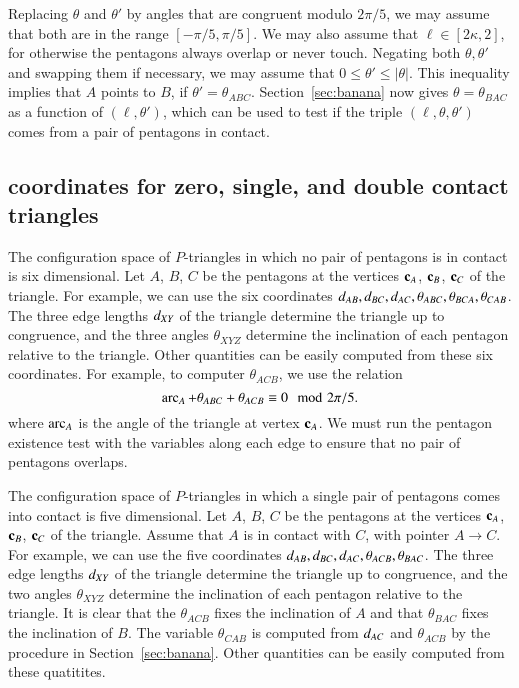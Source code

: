 Replacing $\theta$ and $\theta'$ by angles that are congruent modulo
$2\pi/5$, we may assume that both are in the range $[-\pi/5,\pi/5]$.
We may also assume that $\ell\in [2\kappa,2]$, for otherwise the
pentagons always overlap or never touch.  Negating both
$\theta,\theta'$ and swapping them if necessary, we may assume that
$0\le \theta' \le |\theta|$.  This inequality implies that $A$ points
to $B$, if $\theta'=\theta_{ABC}$.  Section~\ref{sec:banana} now gives
$\theta=\theta_{BAC}$ as a function of $(\ell,\theta')$, which can be
used to test if the triple $(\ell,\theta,\theta')$ comes from a pair
of pentagons in contact.

\subsection{coordinates for zero, single, and double contact
  triangles}

The configuration space of $P$-triangles in which no pair of pentagons
is in contact is six dimensional.  Let $A$, $B$, $C$ be the pentagons
at the vertices ${\mathbf c}_A$, ${\mathbf c}_B$, ${\mathbf c}_C$ of the triangle.  For example,
we can use the six coordinates
$d_{AB},d_{BC},d_{AC},\theta_{ABC},\theta_{BCA},\theta_{CAB}$.  The
three edge lengths $d_{XY}$ of the triangle determine the triangle up
to congruence, and the three angles $\theta_{XYZ}$ determine the
inclination of each pentagon relative to the triangle.  Other
quantities can be easily computed from these six coordinates.  For
example, to computer $\theta_{ACB}$, we use the relation
\[
\operatorname{arc}_A + \theta_{ABC} + \theta_{ACB} \equiv 0\mod 2\pi/5.
\]
where $\operatorname{arc}_A$ is the angle of the triangle at vertex ${\mathbf c}_A$.  We must
run the pentagon existence test with the variables along each edge to
ensure that no pair of pentagons overlaps.

The configuration space of $P$-triangles in which a single pair of
pentagons comes into contact is five dimensional.  Let $A$, $B$, $C$
be the pentagons at the vertices ${\mathbf c}_A$, ${\mathbf c}_B$, ${\mathbf c}_C$ of the
triangle.  Assume that $A$ is in contact with $C$, with pointer $A\to
C$.  For example, we can use the five coordinates
$d_{AB},d_{BC},d_{AC},\theta_{ACB},\theta_{BAC}$.  The three edge
lengths $d_{XY}$ of the triangle determine the triangle up to
congruence, and the two angles $\theta_{XYZ}$ determine the
inclination of each pentagon relative to the triangle.  It is clear
that the $\theta_{ACB}$ fixes the inclination of $A$ and that
$\theta_{BAC}$ fixes the inclination of $B$.  The variable
$\theta_{CAB}$ is computed from $d_{AC}$ and $\theta_{ACB}$ by the
procedure in Section~\ref{sec:banana}.  Other quantities can be easily
computed from these quatitites.

